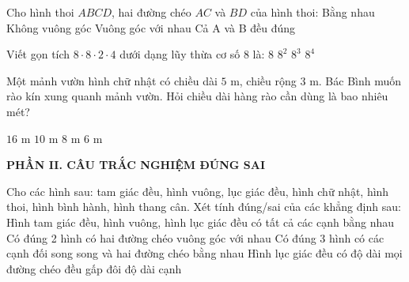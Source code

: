 \documentclass[12pt,a4paper]{article}
\begin{document}
\begin{ex}
Cho hình thoi $ABCD$, hai đường chéo $AC$ và $BD$ của hình thoi:
\choice
{Bằng nhau}
{Không vuông góc}
{\True Vuông góc với nhau}
{Cả A và B đều đúng}
\end{ex}

\begin{ex}
Viết gọn tích $8 \cdot 8 \cdot 2 \cdot 4$ dưới dạng lũy thừa cơ số 8 là:
\choice
{$8$}
{$8^2$}
{\True $8^3$}
{$8^4$}
\end{ex}

\begin{ex}
Một mảnh vườn hình chữ nhật có chiều dài $5\text{ m}$, chiều rộng $3\text{ m}$. Bác Bình muốn rào kín xung quanh mảnh vườn. Hỏi chiều dài hàng rào cần dùng là bao nhiêu mét?
\begin{center}
\end{center}
\choice
{\True $16\text{ m}$}
{$10\text{ m}$}
{$8\text{ m}$}
{$6\text{ m}$}
\end{ex}


\setcounter{ex}{0}
\vspace{2mm}
\noindent\textbf{\large PHẦN II. CÂU TRẮC NGHIỆM ĐÚNG SAI}
\vspace{1mm}
\begin{ex}
Cho các hình sau: tam giác đều, hình vuông, lục giác đều, hình chữ nhật, hình thoi, hình bình hành, hình thang cân. Xét tính đúng/sai của các khẳng định sau:
\choiceTF
{\True Hình tam giác đều, hình vuông, hình lục giác đều có tất cả các cạnh bằng nhau}
{\True Có đúng 2 hình có hai đường chéo vuông góc với nhau}
{\True Có đúng 3 hình có các cạnh đối song song và hai đường chéo bằng nhau}
{Hình lục giác đều có độ dài mọi đường chéo đều gấp đôi độ dài cạnh}
\end{ex}
\end{document}
